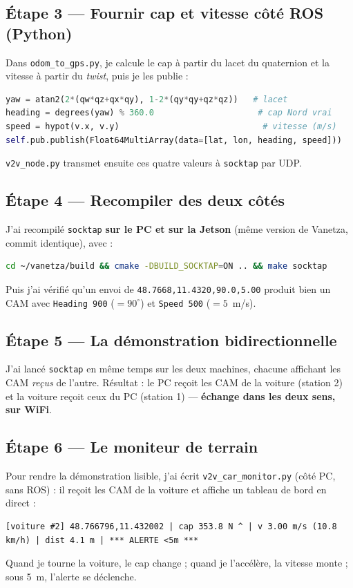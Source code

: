 \documentclass[a4paper,11pt]{article}
\newcommand{\code}[1]{\texttt{#1}}
\begin{document}
\subsection{Étape 3 --- Fournir cap et vitesse côté ROS (Python)}
Dans \code{odom\_to\_gps.py}, je calcule le cap à partir du lacet du quaternion et la vitesse
à partir du \emph{twist}, puis je les publie :
\begin{lstlisting}[language=Python]
yaw = atan2(2*(qw*qz+qx*qy), 1-2*(qy*qy+qz*qz))   # lacet
heading = degrees(yaw) % 360.0                     # cap Nord vrai
speed = hypot(v.x, v.y)                             # vitesse (m/s)
self.pub.publish(Float64MultiArray(data=[lat, lon, heading, speed]))
\end{lstlisting}
\code{v2v\_node.py} transmet ensuite ces quatre valeurs à \code{socktap} par UDP.

\subsection{Étape 4 --- Recompiler des deux côtés}
J'ai recompilé \code{socktap} \textbf{sur le PC et sur la Jetson} (même version de Vanetza,
commit identique), avec :
\begin{lstlisting}[language=bash]
cd ~/vanetza/build && cmake -DBUILD_SOCKTAP=ON .. && make socktap
\end{lstlisting}
Puis j'ai vérifié qu'un envoi de \code{48.7668,11.4320,90.0,5.00} produit bien un CAM avec
\code{Heading 900} ($=90^\circ$) et \code{Speed 500} ($=5$~m/s).

\subsection{Étape 5 --- La démonstration bidirectionnelle}
J'ai lancé \code{socktap} en même temps sur les deux machines, chacune affichant les CAM
\emph{reçus} de l'autre. Résultat : le PC reçoit les CAM de la voiture (station 2) et la
voiture reçoit ceux du PC (station 1) --- \textbf{échange dans les deux sens, sur WiFi}.

\subsection{Étape 6 --- Le moniteur de terrain}
Pour rendre la démonstration lisible, j'ai écrit \code{v2v\_car\_monitor.py} (côté PC, sans
ROS) : il reçoit les CAM de la voiture et affiche un tableau de bord en direct :
\begin{lstlisting}
[voiture #2] 48.766796,11.432002 | cap 353.8 N ^ | v 3.00 m/s (10.8 km/h) | dist 4.1 m | *** ALERTE <5m ***
\end{lstlisting}
Quand je tourne la voiture, le cap change ; quand je l'accélère, la vitesse monte ; sous 5~m,
l'alerte se déclenche.
\end{document}
